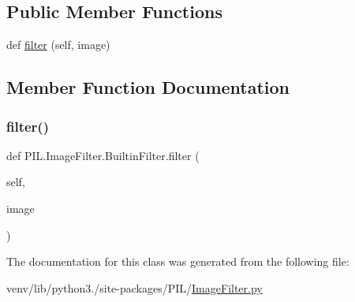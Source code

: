 \subsection*{Public Member Functions}
\begin{DoxyCompactItemize}
\item 
def \hyperlink{classPIL_1_1ImageFilter_1_1BuiltinFilter_a525994d278e3a74ecdf5af83fa532c73}{filter} (self, image)
\end{DoxyCompactItemize}


\subsection{Member Function Documentation}
\mbox{\label{classPIL_1_1ImageFilter_1_1BuiltinFilter_a525994d278e3a74ecdf5af83fa532c73}} 
\subsubsection{\texorpdfstring{filter()}{filter()}}
{\footnotesize\ttfamily def P\+I\+L.\+Image\+Filter.\+Builtin\+Filter.\+filter (\begin{DoxyParamCaption}\item[{}]{self,  }\item[{}]{image }\end{DoxyParamCaption})}



The documentation for this class was generated from the following file\+:\begin{DoxyCompactItemize}
\item 
venv/lib/python3./site-\/packages/\+P\+I\+L/\hyperlink{ImageFilter_8py}{Image\+Filter.\+py}\end{DoxyCompactItemize}
